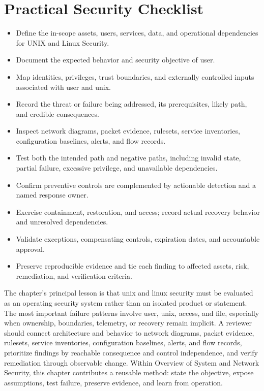 \documentclass[11pt]{article}
\begin{document}
\section*{Practical Security Checklist}
\begin{itemize}[label=$\square$]
\item Define the in-scope assets, users, services, data, and operational dependencies for UNIX and Linux Security.
\item Document the expected behavior and security objective of user.
\item Map identities, privileges, trust boundaries, and externally controlled inputs associated with user and unix.
\item Record the threat or failure being addressed, its prerequisites, likely path, and credible consequences.
\item Inspect network diagrams, packet evidence, rulesets, service inventories, configuration baselines, alerts, and flow records.
\item Test both the intended path and negative paths, including invalid state, partial failure, excessive privilege, and unavailable dependencies.
\item Confirm preventive controls are complemented by actionable detection and a named response owner.
\item Exercise containment, restoration, and access; record actual recovery behavior and unresolved dependencies.
\item Validate exceptions, compensating controls, expiration dates, and accountable approval.
\item Preserve reproducible evidence and tie each finding to affected assets, risk, remediation, and verification criteria.
\end{itemize}
\begin{synthesisbox}
The chapter's principal lesson is that unix and linux security must be evaluated as an operating security system rather than an isolated product or statement. The most important failure patterns involve user, unix, access, and file, especially when ownership, boundaries, telemetry, or recovery remain implicit. A reviewer should connect architecture and behavior to network diagrams, packet evidence, rulesets, service inventories, configuration baselines, alerts, and flow records, prioritize findings by reachable consequence and control independence, and verify remediation through observable change. Within Overview of System and Network Security, this chapter contributes a reusable method: state the objective, expose assumptions, test failure, preserve evidence, and learn from operation.
\end{synthesisbox}
\end{document}
